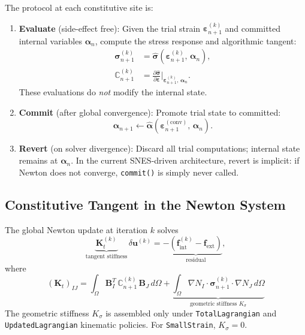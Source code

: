 The protocol at each constitutive site is:

\begin{enumerate}
  \item \textbf{Evaluate} (side-effect free):
        Given the trial strain $\boldsymbol{\varepsilon}_{n+1}^{(k)}$
        and committed internal variables $\boldsymbol{\alpha}_n$,
        compute the stress response and algorithmic tangent:
        \begin{align}
          \boldsymbol{\sigma}_{n+1}^{(k)}
            &= \hat{\boldsymbol{\sigma}}\!\left(
                 \boldsymbol{\varepsilon}_{n+1}^{(k)},\,
                 \boldsymbol{\alpha}_n \right), \\[3pt]
          \mathbb{C}_{n+1}^{(k)}
            &= \frac{\partial\hat{\boldsymbol{\sigma}}}
                    {\partial\boldsymbol{\varepsilon}}
               \bigg|_{
                 \boldsymbol{\varepsilon}_{n+1}^{(k)},\,
                 \boldsymbol{\alpha}_n}.
        \end{align}
        These evaluations do \emph{not} modify the internal state.

  \item \textbf{Commit} (after global convergence):
        Promote trial state to committed:
        \[
          \boldsymbol{\alpha}_{n+1} \leftarrow
            \hat{\boldsymbol{\alpha}}\!\left(
              \boldsymbol{\varepsilon}_{n+1}^{(\text{conv})},\,
              \boldsymbol{\alpha}_n \right).
        \]

  \item \textbf{Revert} (on solver divergence):
        Discard all trial computations; internal state remains at
        $\boldsymbol{\alpha}_n$.  In the current SNES-driven
        architecture, revert is implicit: if Newton does not converge,
        \texttt{commit()} is simply never called.
\end{enumerate}

\subsection{Constitutive Tangent in the Newton System}

The global Newton update at iteration $k$ solves
\begin{equation}
  \underbrace{
    \mathbf{K}_t^{(k)}
  }_{\text{tangent stiffness}}
  \,\delta\!\mathbf{u}^{(k)}
  = -\underbrace{
    \left(\mathbf{f}_{\mathrm{int}}^{(k)} - \mathbf{f}_{\mathrm{ext}}\right)
  }_{\text{residual}},
  \label{eq:newton-update}
\end{equation}
where
\[
  \left(\mathbf{K}_t\right)_{IJ}
    = \int_\Omega
        \mathbf{B}_I^T \,\mathbb{C}_{n+1}^{(k)}\, \mathbf{B}_J
      \,d\Omega
    + \underbrace{
        \int_\Omega
          \nabla N_I \cdot \boldsymbol{\sigma}_{n+1}^{(k)} \cdot \nabla N_J
        \,d\Omega
      }_{\text{geometric stiffness } K_\sigma}
\]
The geometric stiffness $K_\sigma$ is assembled only under
\texttt{TotalLagrangian} and \texttt{UpdatedLagrangian} kinematic
policies.  For \texttt{SmallStrain}, $K_\sigma = 0$.

